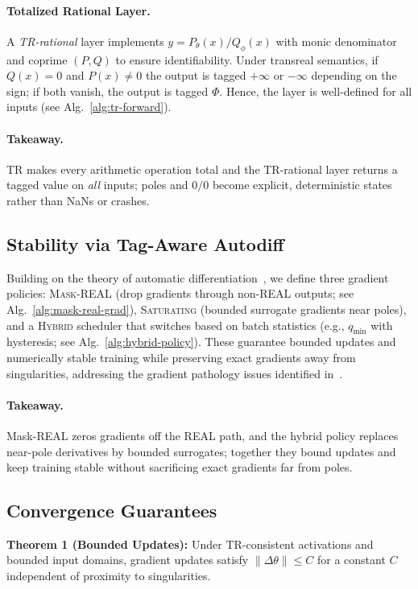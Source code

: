 \documentclass[twoside,11pt]{article}
\newcommand{\trReal}{\textsc{REAL}}
\newcommand{\maskreal}{\textsc{Mask-REAL}}
\newcommand{\saturating}{\textsc{Saturating}}
\newcommand{\hybrid}{\textsc{Hybrid}}
\newcommand{\qmin}{q_{\min}}
\newcommand{\TAGREAL}{\trReal}
\begin{document}
\paragraph{Totalized Rational Layer.} A \emph{TR-rational} layer implements $y = P_\theta(x)/Q_\phi(x)$ with monic denominator and coprime $(P,Q)$ to ensure identifiability. Under transreal semantics, if $Q(x)=0$ and $P(x)\neq 0$ the output is tagged $+\infty$ or $-\infty$ depending on the sign; if both vanish, the output is tagged $\Phi$. Hence, the layer is well-defined for all inputs (see Alg.~\ref{alg:tr-forward}).
\paragraph{Takeaway.} TR makes every arithmetic operation total and the TR-rational layer returns a tagged value on \emph{all} inputs; poles and $0/0$ become explicit, deterministic states rather than NaNs or crashes.

\subsection{Stability via Tag-Aware Autodiff}
Building on the theory of automatic differentiation~\citep{griewank2008evaluating,baydin2017automatic}, we define three gradient policies: \maskreal{} (drop gradients through non-\TAGREAL{} outputs; see Alg.~\ref{alg:mask-real-grad}), \saturating{} (bounded surrogate gradients near poles), and a \hybrid{} scheduler that switches based on batch statistics (e.g., $\qmin$ with hysteresis; see Alg.~\ref{alg:hybrid-policy}). These guarantee bounded updates and numerically stable training while preserving exact gradients away from singularities, addressing the gradient pathology issues identified in~\citet{pascanu2013difficulty,bengio1994learning}.
\paragraph{Takeaway.} Mask-REAL zeros gradients off the \TAGREAL{} path, and the hybrid policy replaces near-pole derivatives by bounded surrogates; together they bound updates and keep training stable without sacrificing exact gradients far from poles.

\subsection{Convergence Guarantees}

\textbf{Theorem 1 (Bounded Updates):} Under TR-consistent activations and bounded input domains, gradient updates satisfy $\|\Delta\theta\| \leq C$ for a constant $C$ independent of proximity to singularities.
\end{document}

